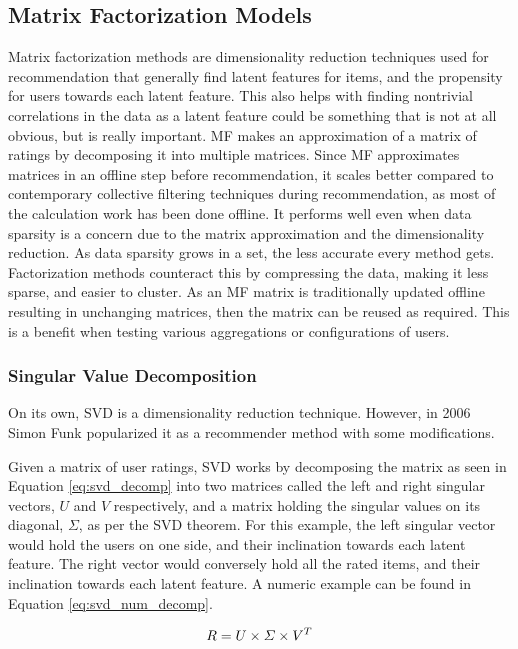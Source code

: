 \subsection{Matrix Factorization Models} \label{bg:sub:factorizationmodels}
Matrix factorization methods are dimensionality reduction techniques used for recommendation that generally find latent features for items, and the propensity for users towards each latent feature. This also helps with finding nontrivial correlations in the data as a latent feature could be something that is not at all obvious, but is really important.
MF makes an approximation of a matrix of ratings by decomposing it into multiple matrices. Since MF approximates matrices in an offline step before recommendation, it scales better compared to contemporary collective filtering techniques during recommendation, as most of the calculation work has been done offline. It performs well even when data sparsity is a concern due to the matrix approximation and the dimensionality reduction.
As data sparsity grows in a set, the less accurate every method gets. Factorization methods counteract this by compressing the data, making it less sparse, and easier to cluster.
As an MF matrix is traditionally updated offline resulting in unchanging matrices, then the matrix can be reused as required. This is a benefit when testing various aggregations or configurations of users.

\subsubsection{Singular Value Decomposition}
On its own, SVD is a dimensionality reduction technique. However, in 2006 Simon Funk popularized it as a recommender method with some modifications\cite{svdsimonfunk}.

Given a matrix of user ratings, SVD works by decomposing the matrix as seen in Equation \ref{eq:svd_decomp} into two matrices called the left and right singular vectors, $U$ and $V$ respectively, and a matrix holding the singular values on its diagonal, $\Sigma$, as per the SVD theorem\cite{svdtheorem}. For this example, the left singular vector would hold the users on one side, and their inclination towards each latent feature. The right vector would conversely hold all the rated items, and their inclination towards each latent feature. A numeric example can be found in Equation \ref{eq:svd_num_decomp}.

\begin{equation} \label{eq:svd_decomp}
\centering
R = U\times \Sigma \times V^T
\end{equation}

